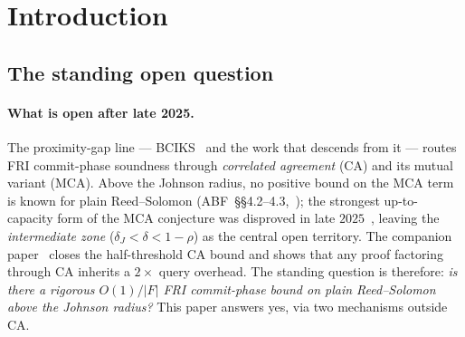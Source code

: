 \documentclass[11pt]{article}
\theoremstyle{definition}
\theoremstyle{remark}
\begin{document}
\begin{abstract}
\smallskip\noindent
\textbf{Where this sits in the EF Proximity Prize landscape.} Our
$K_{1/4} \leq 10$ at the rate-$1/4$ Ethereum row drives the
\emph{commit-phase} term to $K/|F| \leq 10/2^{186} \approx 2^{-183}$,
$55$ bits below the prize target $\varepsilon^* = 2^{-128}$
(the query term $(1{-}\delta)^t$ is calibrated separately by query
budget; the full proof error is the maximum of the two).
The construction is unconditional for sparse adversaries and reduces
to a single \emph{sparse-worst-case dominance} conjecture (Q2) for
general inputs, with the local component closed rigorously at
deployment scale by a finite linear-algebra check ($80/80$ cases ---
$20$ distinct $80$-tuples~$M \subset L_0$ at each of the four
deployment primes). Companion papers cover the remaining prize rates
(rate-uniform half-threshold CA at every $\rho$~\cite{Paper1}; codim
doubling on the Berlekamp realizer~\cite{Paper3Companion}). A
universal extension to the $(3k/2, 2k)$ family of arising pencils
reduces, by a self-contained argument, to a single named open
problem in classical cyclotomic number theory (Q1; settled rigorously
over $\mathbb{Q}$ at the first two cases of interest).
\end{abstract}

\section{Introduction}
\label{sec:intro}

\subsection{The standing open question}
\label{ssec:deployment-question}

\paragraph{What is open after late 2025.}
The proximity-gap line --- BCIKS~\cite{BCIKS} and the work that
descends from it --- routes FRI commit-phase soundness through
\emph{correlated agreement} (CA) and its mutual variant (MCA). Above
the Johnson radius, no positive bound on the MCA term is known for
plain Reed--Solomon (ABF~\S\S 4.2--4.3,~\cite{BCIKS}); the strongest
up-to-capacity form of the MCA conjecture was disproved in late
$2025$~\cite{CritesStewart2025,BCHKS,DiamondGruen}, leaving the
\emph{intermediate zone} ($\delta_J < \delta < 1 - \rho$) as the
central open territory. The companion paper~\cite{Paper1} closes the
half-threshold CA bound and shows that any proof factoring through CA
inherits a $2{\times}$ query overhead. The standing question is
therefore: \emph{is there a rigorous $O(1)/|F|$ FRI commit-phase
bound on plain Reed--Solomon above the Johnson radius?} This paper
answers yes, via two mechanisms outside CA.
\end{document}

